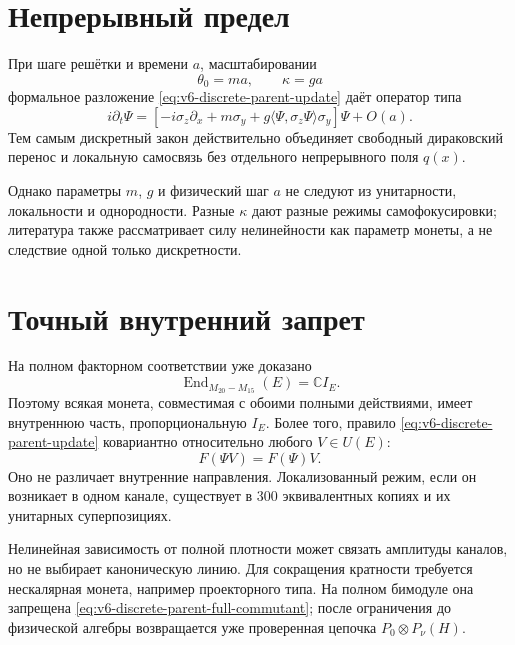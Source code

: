 \section{Непрерывный предел}

При шаге решётки и времени $a$, масштабировании
\begin{equation}
 \theta_0=ma,\qquad \kappa=ga
\end{equation}
формальное разложение \eqref{eq:v6-discrete-parent-update} даёт оператор
типа
\begin{equation}
 i\partial_t\Psi=
 \left[-i\sigma_z\partial_x+m\sigma_y
 +g\langle\Psi,\sigma_z\Psi\rangle\sigma_y\right]\Psi+O(a).
 \label{eq:v6-discrete-parent-nonlinear-dirac}
\end{equation}
Тем самым дискретный закон действительно объединяет свободный дираковский
перенос и локальную самосвязь без отдельного непрерывного поля $q(x)$.

Однако параметры $m$, $g$ и физический шаг $a$ не следуют из унитарности,
локальности и однородности. Разные $\kappa$ дают разные режимы
самофокусировки; литература также рассматривает силу нелинейности как
параметр монеты, а не следствие одной только дискретности.

\section{Точный внутренний запрет}

На полном факторном соответствии уже доказано
\begin{equation}
 \operatorname{End}_{M_{20}-M_{15}}(E)=\mathbb C I_E.
 \label{eq:v6-discrete-parent-full-commutant}
\end{equation}
Поэтому всякая монета, совместимая с обоими полными действиями, имеет
внутреннюю часть, пропорциональную $I_E$. Более того, правило
\eqref{eq:v6-discrete-parent-update} ковариантно относительно любого
$V\in U(E)$:
\begin{equation}
 F(\Psi V)=F(\Psi)V.
\end{equation}
Оно не различает внутренние направления. Локализованный режим, если он
возникает в одном канале, существует в 300 эквивалентных копиях и их
унитарных суперпозициях.

Нелинейная зависимость от полной плотности может связать амплитуды каналов,
но не выбирает каноническую линию. Для сокращения кратности требуется
нескалярная монета, например проекторного типа. На полном бимодуле она
запрещена \eqref{eq:v6-discrete-parent-full-commutant}; после ограничения
до физической алгебры возвращается уже проверенная цепочка
$P_0\otimes P_\nu(H)$.

